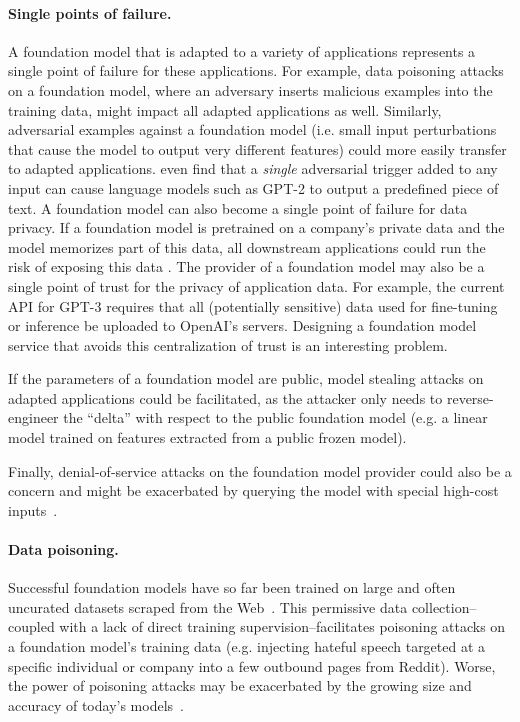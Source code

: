 \paragraph{Single points of failure.} A foundation model that is adapted to a variety of applications represents a single point of failure for these applications. For example, data poisoning attacks on a foundation model, where an adversary inserts malicious examples into the training data, might impact all adapted applications as well. Similarly, adversarial examples against a foundation model (i.e. small input perturbations that cause the model to output very different features) could more easily transfer to adapted applications. \citet{wallace2019universal} even find that a \emph{single} adversarial trigger added to any input can cause language models such as GPT-2 to output a predefined piece of text. A foundation model can also become a single point of failure for data privacy. If a foundation model is pretrained on a company's private data and the model memorizes part of this data, all downstream applications could run the risk of exposing this data \citep{carlini2020extracting}. The provider of a foundation model may also be a single point of trust for the privacy of application data. For example, the current API for GPT-3 requires that all (potentially sensitive) data used for fine-tuning or inference be uploaded to OpenAI's servers. Designing a foundation model service that avoids this centralization of trust is an interesting problem.

If the parameters of a foundation model are public, model stealing attacks on adapted applications could be facilitated, as the attacker only needs to reverse-engineer the ``delta'' with respect to the public foundation model \citep{krishna2019thieves} (e.g. a linear model trained on features extracted from a public frozen model).

Finally, denial-of-service attacks on the foundation model provider could also be a concern and might be exacerbated by querying the model with special high-cost inputs~\citep{shumailov2020sponge}.

\paragraph{Data poisoning.} Successful foundation models have so far been trained on large and often uncurated datasets scraped from the Web~\citep{radford2021learning,radford2019language}. This permissive data collection--coupled with a lack of direct training supervision--facilitates poisoning attacks on a foundation model's training data (e.g. injecting hateful speech targeted at a specific individual or company into a few outbound pages from Reddit). Worse, the power of poisoning attacks may be exacerbated by the  growing size and accuracy of today's models~\citep{carlini2021poisoningssl}.

